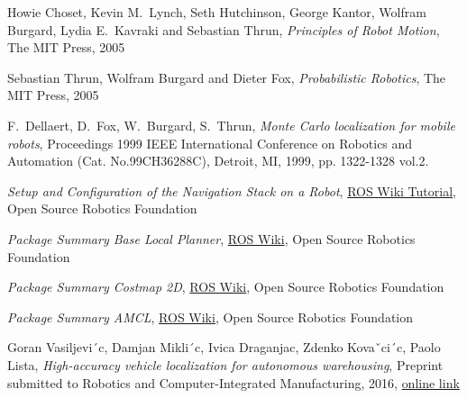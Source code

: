 \documentclass[10pt,journal,compsoc]{IEEEtran}
\begin{document}

\begin{thebibliography}{8}

Howie Choset, Kevin M.\ Lynch, Seth Hutchinson, George Kantor, Wolfram Burgard, Lydia E.\ Kavraki and Sebastian Thrun, \textit{Principles of Robot Motion}, The MIT Press, 2005

Sebastian Thrun, Wolfram Burgard and Dieter Fox, \textit{Probabilistic Robotics}, The MIT Press, 2005

F.\ Dellaert, D.\ Fox, W.\ Burgard, S.\ Thrun, \textit{Monte Carlo localization for mobile robots}, Proceedings 1999 IEEE International Conference on Robotics and Automation (Cat. No.99CH36288C), Detroit, MI, 1999, pp. 1322-1328 vol.2.

\textit{Setup and Configuration of the Navigation Stack on a Robot},
\href{http://wiki.ros.org/navigation/Tutorials/RobotSetup/}{ROS Wiki Tutorial}, Open Source Robotics Foundation

\textit{Package Summary Base Local Planner},
\href{http://wiki.ros.org/base_local_planner}{ROS Wiki}, Open Source Robotics Foundation

\textit{Package Summary Costmap 2D},
\href{http://wiki.ros.org/costmap_2d}{ROS Wiki}, Open Source Robotics Foundation

\textit{Package Summary AMCL},
\href{http://wiki.ros.org/amcl}{ROS Wiki}, Open Source Robotics Foundation

Goran Vasiljevi´c, Damjan Mikli´c, Ivica Draganjac, Zdenko Kovaˇci´c, Paolo Lista, \textit{High-accuracy vehicle localization for autonomous
warehousing}, Preprint submitted to Robotics and Computer-Integrated Manufacturing, 2016, \href{https://bib.irb.hr/datoteka/816062.warehousing_localization.pdf}{online link}
\end{thebibliography}
\end{document}
